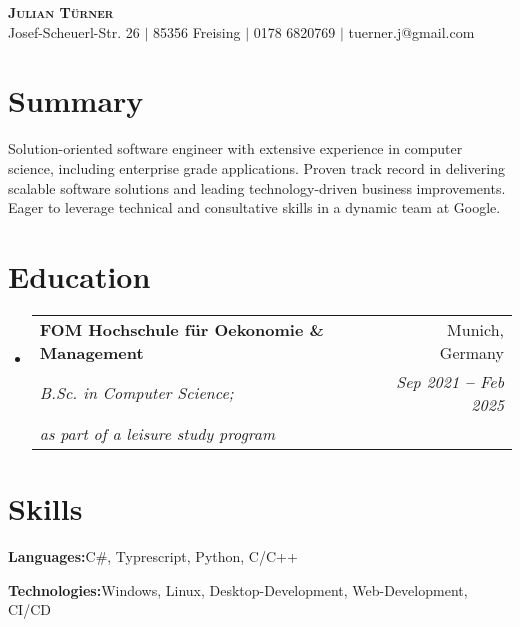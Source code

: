\documentclass[letterpaper,11pt]{article}
\makeatletter
\newcommand{\resumeEducationHeading}[6]{
    \vspace{-2pt}\item
    \begin{tabular*}{0.97\textwidth}[t]{l@{\extracolsep{\fill}}r}
      \textbf{#1} & #2 \\
      \textit{\small#3} & \textit{\small #4} \\
      \textit{\small#5} & \textit{\small #6} \\
    \end{tabular*}\vspace{-5pt}
  }
\newcommand{\resumeSubHeadingListStart}{\begin{itemize}[leftmargin=0.15in, label={}]}
\newcommand{\resumeSubHeadingListEnd}{\end{itemize}}
\makeatother
\begin{document}

  \begin{center}
    \textbf{\Huge \scshape Julian T{\"u}rner} \\ \vspace{3pt}
    \small
    Josef-Scheuerl-Str. 26
    $|$
    85356 Freising
    $|$
    0178 6820769
    $|$
    tuerner.j@gmail.com
  \end{center}

  \section{Summary}
  \vspace{3pt}
  \small{
    Solution-oriented software engineer with extensive experience in computer science, including enterprise grade applications. 
    Proven track record in delivering scalable software solutions and leading technology-driven business improvements. 
    Eager to leverage technical and consultative skills in a dynamic team at Google.
  }

  \section{Education}
  \vspace{3pt}
  \resumeSubHeadingListStart

  \resumeEducationHeading
  {FOM Hochschule f{\"u}r Oekonomie \& Management
  }{Munich, Germany}
  {B.Sc. in Computer Science;}{Sep 2021 \textbf{--} Feb 2025}
  {as part of a leisure study program}{}
  \resumeSubHeadingListEnd


  \section{Skills}
  \vspace{2pt}
  \resumeSubHeadingListStart
  \small{\item{

      \textbf{Languages:}{C\#, Typrescript, Python, C/C++} \\ \vspace{3pt}

      \textbf{Technologies:}{Windows, Linux, Desktop-Development, Web-Development, CI/CD} \\ \vspace{4pt}
  }}
  \resumeSubHeadingListEnd
\end{document}
